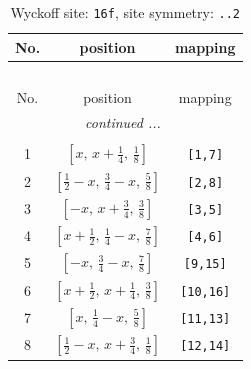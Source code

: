 \documentclass[fleqn,8pt]{jsarticle}
\begin{document}
\begin{longtable}{ccc}
\caption{Wyckoff site: {\tt 16f}, site symmetry: {\tt ..2}}
 \\
 \hline \hline
No. & position & mapping \\ \hline \endfirsthead

\multicolumn{2}{l}{\tablename\ \thetable{}} \\
 \hline \hline
No. & position & mapping \\ \hline \endhead

 \hline \hline
\multicolumn{2}{r}{\footnotesize\it continued ...} \\ \endfoot

 \hline \hline
\multicolumn{2}{r}{} \\ \endlastfoot

1 & $\left[ x,\, x + \frac{1}{4},\, \frac{1}{8} \right]$ & {\tt [1,7]} \\ \hline
2 & $\left[ \frac{1}{2} - x,\, \frac{3}{4} - x,\, \frac{5}{8} \right]$ & {\tt [2,8]} \\ \hline
3 & $\left[ - x,\, x + \frac{3}{4},\, \frac{3}{8} \right]$ & {\tt [3,5]} \\ \hline
4 & $\left[ x + \frac{1}{2},\, \frac{1}{4} - x,\, \frac{7}{8} \right]$ & {\tt [4,6]} \\ \hline
5 & $\left[ - x,\, \frac{3}{4} - x,\, \frac{7}{8} \right]$ & {\tt [9,15]} \\ \hline
6 & $\left[ x + \frac{1}{2},\, x + \frac{1}{4},\, \frac{3}{8} \right]$ & {\tt [10,16]} \\ \hline
7 & $\left[ x,\, \frac{1}{4} - x,\, \frac{5}{8} \right]$ & {\tt [11,13]} \\ \hline
8 & $\left[ \frac{1}{2} - x,\, x + \frac{3}{4},\, \frac{1}{8} \right]$ & {\tt [12,14]} \\
\end{longtable}
\renewcommand{\arraystretch}{1.2}
\end{document}

